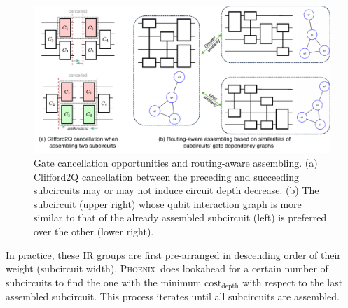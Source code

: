 \documentclass[conference,9pt]{IEEEtran}
\newcommand{\phoenix}{\textsc{Phoenix}}
\begin{document}
    \begin{figure}[tbp]
        \centering
        \includegraphics[width=\columnwidth]{figures/gate_cancel.pdf}
        \caption{Gate cancellation opportunities and routing-aware assembling.  (a) Clifford2Q cancellation between the preceding and succeeding subcircuits may or may not induce circuit depth decrease.  (b) The subcircuit (upper right) whose qubit interaction graph is more similar to that of the already assembled subcircuit (left) is preferred over the other (lower right).}
        \label{fig:gate-cancel}
    \end{figure}

    In practice, these IR groups are first pre-arranged in descending order of their weight (subcircuit width). \phoenix\ does lookahead for a certain number of subcircuits to find the one with the minimum $\mathrm{cost}_\mathrm{depth}$ with respect to the last assembled subcircuit. This process iterates until all subcircuits are assembled. %
    
\end{document}
